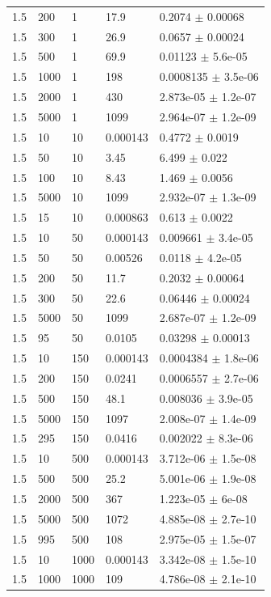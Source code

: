 \begin{longtable}{lllll}
	1.5 & 200 & 1 & 17.9 & 0.2074 $\pm$ 0.00068 \\
	1.5 & 300 & 1 & 26.9 & 0.0657 $\pm$ 0.00024 \\
	1.5 & 500 & 1 & 69.9 & 0.01123 $\pm$ 5.6e-05 \\
	1.5 & 1000 & 1 & 198 & 0.0008135 $\pm$ 3.5e-06 \\
	1.5 & 2000 & 1 & 430 & 2.873e-05 $\pm$ 1.2e-07 \\
	1.5 & 5000 & 1 & 1099 & 2.964e-07 $\pm$ 1.2e-09 \\
	1.5 & 10 & 10 & 0.000143 & 0.4772 $\pm$ 0.0019 \\
	1.5 & 50 & 10 & 3.45 & 6.499 $\pm$ 0.022 \\
	1.5 & 100 & 10 & 8.43 & 1.469 $\pm$ 0.0056 \\
	1.5 & 5000 & 10 & 1099 & 2.932e-07 $\pm$ 1.3e-09 \\
	1.5 & 15 & 10 & 0.000863 & 0.613 $\pm$ 0.0022 \\
	1.5 & 10 & 50 & 0.000143 & 0.009661 $\pm$ 3.4e-05 \\
	1.5 & 50 & 50 & 0.00526 & 0.0118 $\pm$ 4.2e-05 \\
	1.5 & 200 & 50 & 11.7 & 0.2032 $\pm$ 0.00064 \\
	1.5 & 300 & 50 & 22.6 & 0.06446 $\pm$ 0.00024 \\
	1.5 & 5000 & 50 & 1099 & 2.687e-07 $\pm$ 1.2e-09 \\
	1.5 & 95 & 50 & 0.0105 & 0.03298 $\pm$ 0.00013 \\
	1.5 & 10 & 150 & 0.000143 & 0.0004384 $\pm$ 1.8e-06 \\
	1.5 & 200 & 150 & 0.0241 & 0.0006557 $\pm$ 2.7e-06 \\
	1.5 & 500 & 150 & 48.1 & 0.008036 $\pm$ 3.9e-05 \\
	1.5 & 5000 & 150 & 1097 & 2.008e-07 $\pm$ 1.4e-09 \\
	1.5 & 295 & 150 & 0.0416 & 0.002022 $\pm$ 8.3e-06 \\
	1.5 & 10 & 500 & 0.000143 & 3.712e-06 $\pm$ 1.5e-08 \\
	1.5 & 500 & 500 & 25.2 & 5.001e-06 $\pm$ 1.9e-08 \\
	1.5 & 2000 & 500 & 367 & 1.223e-05 $\pm$ 6e-08 \\
	1.5 & 5000 & 500 & 1072 & 4.885e-08 $\pm$ 2.7e-10 \\
	1.5 & 995 & 500 & 108 & 2.975e-05 $\pm$ 1.5e-07 \\
	1.5 & 10 & 1000 & 0.000143 & 3.342e-08 $\pm$ 1.5e-10 \\
	1.5 & 1000 & 1000 & 109 & 4.786e-08 $\pm$ 2.1e-10 \\

\end{longtable}
